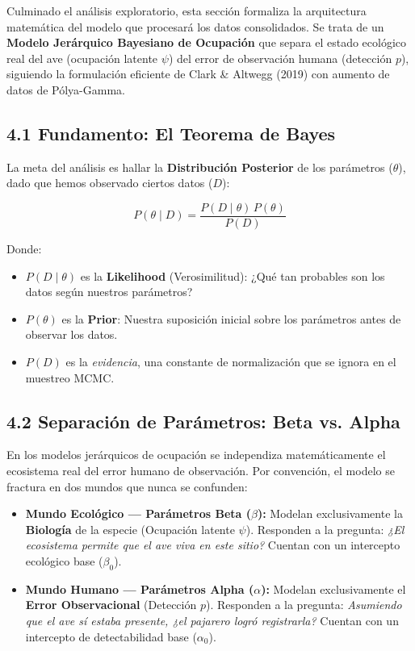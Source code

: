 \documentclass[12pt]{article}
\begin{document}
Culminado el análisis exploratorio, esta sección formaliza la arquitectura matemática del modelo que procesará los datos consolidados. Se trata de un \textbf{Modelo Jerárquico Bayesiano de Ocupación} que separa el estado ecológico real del ave (ocupación latente $\psi$) del error de observación humana (detección $p$), siguiendo la formulación eficiente de Clark \& Altwegg (2019) con aumento de datos de Pólya-Gamma.

\subsection*{4.1 Fundamento: El Teorema de Bayes}

La meta del análisis es hallar la \textbf{Distribución Posterior} de los parámetros ($\theta$), dado que hemos observado ciertos datos ($D$):

\begin{equation}
  P(\theta \mid D) = \frac{P(D \mid \theta)\, P(\theta)}{P(D)}
\end{equation}

Donde:
\begin{itemize}
  \item $P(D \mid \theta)$ es la \textbf{Likelihood} (Verosimilitud): ¿Qué tan probables son los datos según nuestros parámetros?
  \item $P(\theta)$ es la \textbf{Prior}: Nuestra suposición inicial sobre los parámetros antes de observar los datos.
  \item $P(D)$ es la \textit{evidencia}, una constante de normalización que se ignora en el muestreo MCMC.
\end{itemize}

\subsection*{4.2 Separación de Parámetros: Beta vs. Alpha}

En los modelos jerárquicos de ocupación se independiza matemáticamente el ecosistema real del error humano de observación. Por convención, el modelo se fractura en dos mundos que nunca se confunden:

\begin{itemize}
  \item \textbf{Mundo Ecológico --- Parámetros Beta ($\beta$):} Modelan exclusivamente la \textbf{Biología} de la especie (Ocupación latente $\psi$). Responden a la pregunta: \textit{¿El ecosistema permite que el ave viva en este sitio?} Cuentan con un intercepto ecológico base ($\beta_0$).
  \item \textbf{Mundo Humano --- Parámetros Alpha ($\alpha$):} Modelan exclusivamente el \textbf{Error Observacional} (Detección $p$). Responden a la pregunta: \textit{Asumiendo que el ave sí estaba presente, ¿el pajarero logró registrarla?} Cuentan con un intercepto de detectabilidad base ($\alpha_0$).
\end{itemize}
\end{document}
